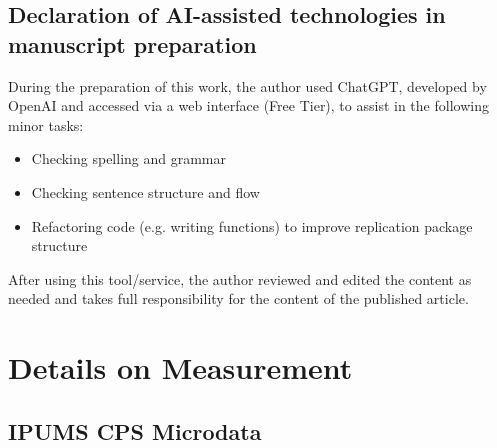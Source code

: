 \documentclass[12pt]{article}
\begin{document}
\newpage
\subsection*{Declaration of AI-assisted technologies in manuscript preparation}

During the preparation of this work, the author used ChatGPT, developed by OpenAI and accessed via a web interface (Free Tier), to assist in the following minor tasks:
\begin{itemize}
\item Checking spelling and grammar
\item Checking sentence structure and flow
\item Refactoring code (e.g. writing functions) to improve replication package structure
\end{itemize}

\noindent After using this tool/service, the author reviewed and edited the content as needed and takes full responsibility for the content of the published article.

\newpage


\newpage
\appendix

\renewcommand\thefigure{\thesection.\arabic{figure}}    
\renewcommand\thetable{\thesection.\arabic{table}}
\renewcommand\theequation{\thesection.\arabic{equation}}
\setcounter{figure}{0}
\setcounter{table}{0}
\setcounter{equation}{0}

\section{Details on Measurement}\label{app:sec:measurement}

\subsection{IPUMS CPS Microdata}
\end{document}
